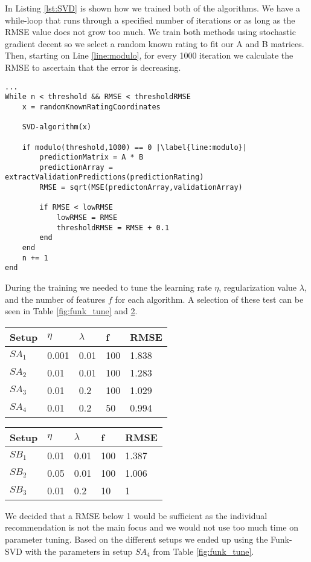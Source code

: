 In Listing \ref{lst:SVD} is shown how we trained both of the algorithms. We have a while-loop that runs through a specified number of iterations or as long as the RMSE value does not grow too much.
We train both methods using stochastic gradient decent so we select a random known rating to fit our A and B matrices. Then, starting on Line \ref{line:modulo}, for every 1000 iteration we calculate the RMSE to ascertain that the error is decreasing. 

\begin{lstlisting}[caption={Training of the prediction matrix},label=lst:SVD,escapechar=|]
...
While n < threshold && RMSE < thresholdRMSE
	x = randomKnownRatingCoordinates
	
	SVD-algorithm(x)
	
	if modulo(threshold,1000) == 0 |\label{line:modulo}|
		predictionMatrix = A * B
		predictionArray = extractValidationPredictions(predictionRating)
		RMSE = sqrt(MSE(predictonArray,validationArray)	
		
		if RMSE < lowRMSE 
			lowRMSE = RMSE 
			thresholdRMSE = RMSE + 0.1
		end
	end
	n += 1
end
\end{lstlisting}

During the training we needed to tune the learning rate $\eta$, regularization value $\lambda$, and the number of features $f$ for each algorithm. A selection of these test can be seen in Table \ref{fig:funk_tune} and \ref{fig:SVD_tune}.
\begin{table}[h]
\centering
\begin{minipage}{.48\textwidth}\centering
\begin{tabular}{|l|llll|}
\hline
Setup	& $\eta$ & $\lambda$ & f   & RMSE   \\ \hline
$SA_1$	& 0.001  & 0.01      & 100 & 1.838 \\ \hline
$SA_2$	& 0.01   & 0.01      & 100 & 1.283 \\ \hline
$SA_3$	& 0.01   & 0.2       & 100 & 1.029 \\ \hline
$SA_4$	& 0.01   & 0.2		 & 50  & 0.994 \\ \hline
\end{tabular}
\label{fig:funk_tune}
\end{minipage}
\hfill
\begin{minipage}{.48\textwidth}\centering
\begin{tabular}{|l|llll|}
\hline
Setup	& $\eta$ & $\lambda$ & f   & RMSE \\ \hline
$SB_1$	& 0.01   & 0.01   & 100 & 1.387   \\ \hline
$SB_2$	& 0.05   & 0.01   & 100 & 1.006  \\ \hline
$SB_3$	& 0.01   & 0.2    & 10 	& 1		  \\ \hline
\end{tabular}
\label{fig:SVD_tune}
\end{minipage}
\end{table}

We decided that a RMSE below 1 would be sufficient as the individual recommendation is not the main focus and we would not use too much time on parameter tuning. Based on the different setups we ended up using the Funk-SVD with the parameters in setup $SA_4$ from Table \ref{fig:funk_tune}.